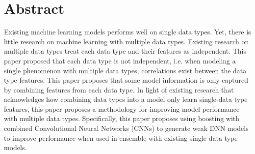 
\section{Abstract}

Existing machine learning models performs well on single data types.  Yet, there is little research on machine learning with multiple data types.  Existing research on multiple data types treat each data type and their features as independent.  This paper proposed that each data type is not independent, i.e. when modeling a single phenomenon with multiple data types, correlations exist between the data type features. This paper proposes that some model information is only captured by combining features from each data type.  In light of existing research that acknowledges how combining data types into a model only learn single-data type features, this paper proposes a methodology for improving model performance with multiple data types.  Specifically, this paper proposes using boosting with combined Convolutional Neural Networks (CNNs) to generate weak DNN models to improve performance when used in ensemble with existing single-data type models.












